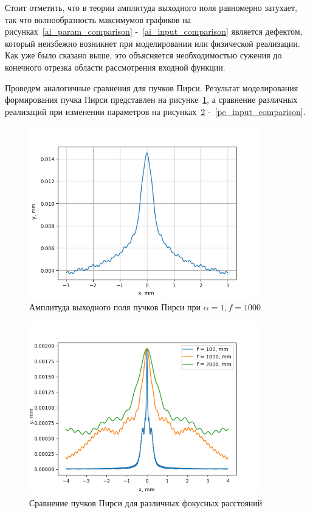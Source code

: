 {    Стоит отметить, что в теории амплитуда выходного поля
    равномерно затухает, так что волнообразность максимумов графиков на
    рисунках~\ref{ai_param_comparison} -~\ref{ai_input_comparison} является дефектом,
    который неизбежно возникнет при моделировании или физической реализации. Как уже было сказано выше, это
    объясняется необходимостью сужения до конечного отрезка области
    рассмотрения входной функции.

    Проведем аналогичные сравнения для пучков Пирси. Результат моделирования формирования пучка Пирси представлен на рисунке~\ref{pearceyoutput3},
    а сравнение различных реализаций при изменении параметров на рисунках~\ref{pe_focus_comparison} -~\ref{pe_input_comparison}.

    \begin{figure}[H]
        \begin{center}
            \includegraphics[width=10cm]{plots/pearceyoutput3}
            \caption{Амплитуда выходного поля пучков Пирси при $ \alpha  = 1, f = 1000$}
            \label{pearceyoutput3}
        \end{center}
    \end{figure}

    \begin{figure}[H]
        \begin{center}
            \includegraphics[width=10cm]{plots/pe_focus_comparison}
            \caption{Сравнение пучков Пирси для различных фокусных расстояний}
            \label{pe_focus_comparison}
        \end{center}
    \end{figure}

}

